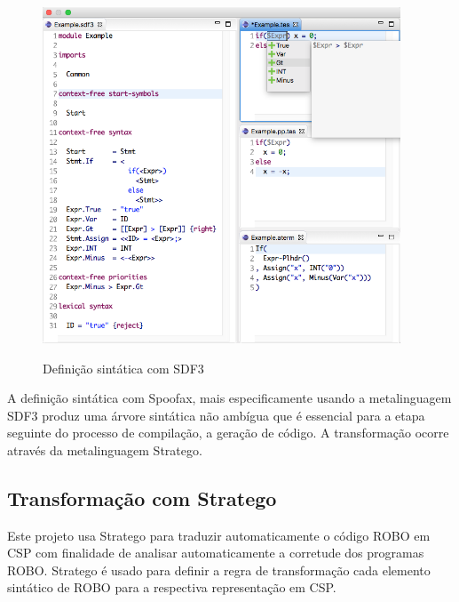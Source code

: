 \begin{figure}[h]
\centering
\caption{Definição sintática com SDF3}
\includegraphics[height=10cm]{figuras/sdf3-spoofax.png}
\label{fig:sdf}
\end{figure}

A definição sintática com Spoofax, mais especificamente usando a metalinguagem SDF3
produz uma árvore sintática não ambígua que é essencial para a etapa seguinte do processo de compilação, a geração de código. A transformação ocorre através da metalinguagem Stratego.

\subsection{Transformação com Stratego}


Este projeto usa Stratego para traduzir automaticamente o código ROBO em CSP com finalidade de analisar automaticamente a corretude dos programas ROBO. Stratego é usado para definir a regra de transformação cada elemento sintático de ROBO para a respectiva representação em CSP.

